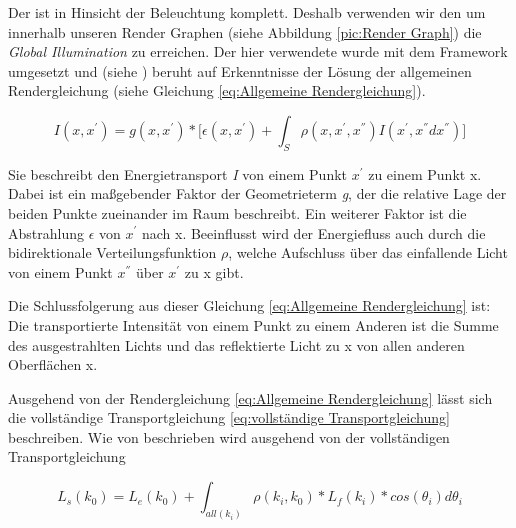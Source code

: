 \par 

Der  ist in Hinsicht der Beleuchtung komplett. 
Deshalb verwenden wir den  um innerhalb unseren Render Graphen
(siehe Abbildung \ref{pic:Render Graph}) die \textit{Global Illumination} zu erreichen. 
Der hier verwendete  wurde mit dem Framework umgesetzt und
(siehe \cite{Benty18}) beruht auf Erkenntnisse der Lösung der allgemeinen Rendergleichung
(siehe Gleichung \ref{eq:Allgemeine Rendergleichung}).

\begin{tcolorbox}[rightrule=3mm, rounded corners=east]
    \begin{equation}\label{eq:Allgemeine Rendergleichung}
        I(x,{x}^{'}) = g(x,{x}^{'}) * \biggl[\epsilon(x,{x}^{'}) + 
        \int_{S}^{} \rho(x,{x}^{'},{x}^{''})
        I({x}^{'},{x}^{''}d{x}^{''})\biggr] 
    \end{equation}
\end{tcolorbox}

Sie beschreibt den Energietransport \textit{I} von einem Punkt ${x}^{'}$
zu einem Punkt x. Dabei ist ein maßgebender Faktor der Geometrieterm \textit{g},
der die relative Lage der beiden Punkte zueinander im Raum beschreibt.
Ein weiterer Faktor ist die Abstrahlung \textit{$\epsilon$} von ${x}^{'}$ nach x. 
Beeinflusst wird der Energiefluss auch durch
die bidirektionale Verteilungsfunktion \textit{$\rho$}, welche Aufschluss über
das einfallende Licht von einem Punkt ${x}^{''}$ über ${x}^{'}$ zu x gibt.\par
Die Schlussfolgerung aus dieser Gleichung \ref{eq:Allgemeine Rendergleichung} ist: Die transportierte
Intensität von einem Punkt zu einem Anderen ist die Summe des ausgestrahlten Lichts 
und das reflektierte Licht zu x von allen anderen Oberflächen x.

Ausgehend von der Rendergleichung \ref{eq:Allgemeine Rendergleichung} lässt sich
die vollständige Transportgleichung \ref{eq:vollständige Transportgleichung}
beschreiben.
Wie von \cite{marschner2009fundamentals} beschrieben wird ausgehend von der vollständigen Transportgleichung

\begin{tcolorbox}[rightrule=3mm, rounded corners=east]
    \begin{equation}\label{eq:vollständige Transportgleichung}
        L_s(k_0) = L_e(k_0) + \int_{all(k_i)}^{} \rho(k_i, k_0)*L_f(k_i)*cos(\theta_i)d\theta_i
    \end{equation}
\end{tcolorbox}

